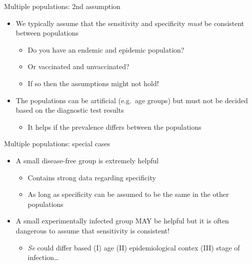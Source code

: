 \documentclass[
  ignorenonframetext,
]{beamer}
\providecommand{\tightlist}{%
  \setlength{\itemsep}{0pt}\setlength{\parskip}{0pt}}
\begin{document}
\begin{frame}
\begin{block}{Multiple populations: 2nd assumption}
\protect\hypertarget{multiple-populations-2nd-assumption}{}
\begin{itemize}
\tightlist
\item
  We typically assume that the sensitivity and specificity \emph{must}
  be consistent between populations

  \begin{itemize}
  \tightlist
  \item
    Do you have an endemic and epidemic population?
  \item
    Or vaccinated and unvaccinated?
  \item
    If so then the assumptions might not hold!
  \end{itemize}
\end{itemize}

\pause

\begin{itemize}
\tightlist
\item
  The populations can be artificial (e.g.~age groups) but must not be
  decided based on the diagnostic test results

  \begin{itemize}
  \tightlist
  \item
    It helps if the prevalence differs between the populations
  \end{itemize}
\end{itemize}
\end{block}
\end{frame}

\begin{frame}
\begin{block}{Multiple populations: special cases}
\protect\hypertarget{multiple-populations-special-cases}{}
\begin{itemize}
\tightlist
\item
  A small disease-free group is extremely helpful

  \begin{itemize}
  \tightlist
  \item
    Contains strong data regarding specificity
  \item
    As long as specificity can be assumed to be the same in the other
    populations
  \end{itemize}
\end{itemize}

\pause

\begin{itemize}
\tightlist
\item
  A small experimentally infected group MAY be helpful but it is often
  dangerous to assume that sensitivity is consistent!

  \begin{itemize}
  \tightlist
  \item
    \emph{Se} could differ based (I) age (II) epidemiological contex
    (III) stage of infection\ldots{}
  \end{itemize}
\end{itemize}
\end{block}
\end{frame}
\end{document}

